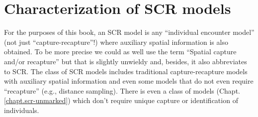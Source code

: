 \section{Characterization of SCR models}
\label{modeling.sec.characterization}

For the purposes of this book, an SCR model is any ``individual
encounter model'' (not just ``capture-recapture''!) where auxiliary
spatial information is also obtained. To be more precise we could as
well use the term ``Spatial capture and/or recapture'' but that is
slightly unwieldy and, besides, it also abbreviates to SCR. The class
of SCR models includes traditional capture-recapture models with
auxiliary spatial information and even some
models that do not even require ``recapture'' (e.g., distance
sampling).  There is even a class of models (Chapt. \ref{chapt.scr-unmarked})
which don't require unique capture or
identification of individuals.

